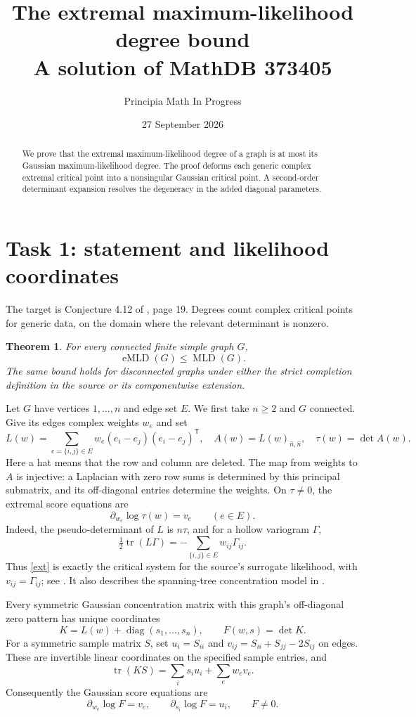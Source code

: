 \documentclass[11pt]{article}
\title{The extremal maximum-likelihood degree bound\\
\large A solution of MathDB 373405}
\author{Principia Math In Progress}
\date{27 September 2026}
\newtheorem{theorem}{Theorem}
\newcommand{\diag}{\operatorname{diag}}
\newcommand{\MLD}{\operatorname{MLD}}
\newcommand{\eMLD}{\operatorname{eMLD}}
\begin{document}
\maketitle
\begin{abstract}
We prove that the extremal maximum-likelihood degree of a graph is at
most its Gaussian maximum-likelihood degree. The proof deforms each
generic complex extremal critical point into a nonsingular Gaussian
critical point. A second-order determinant expansion resolves the
degeneracy in the added diagonal parameters.
\end{abstract}

\section*{Task 1: statement and likelihood coordinates}
The target is Conjecture 4.12 of \cite{ACGR}, page 19.
Degrees count complex critical points for generic data, on the domain
where the relevant determinant is nonzero.
\begin{theorem}\label{main}
For every connected finite simple graph $G$,
\[
 \eMLD(G)\leq\MLD(G).
\]
The same bound holds for disconnected graphs under either the strict
completion definition in the source or its componentwise extension.
\end{theorem}

Let $G$ have vertices $1,\ldots,n$ and edge set $E$. We first take
$n\geq2$ and $G$ connected. Give its edges complex weights $w_e$ and set
\[
 L(w)=\sum_{e=\{i,j\}\in E}w_e(e_i-e_j)(e_i-e_j)^{\mathsf T},
 \quad A(w)=L(w)_{\widehat n,\widehat n},\quad \tau(w)=\det A(w).
\]
Here a hat means that the row and column are deleted. The map from
weights to $A$ is injective: a Laplacian with zero row sums is determined
by this principal submatrix, and its off-diagonal entries determine the
weights. On $\tau\ne0$, the extremal score equations are
\begin{equation}\label{ext}
 \partial_{w_e}\log\tau(w)=v_e\qquad(e\in E).
\end{equation}
Indeed, the pseudo-determinant of $L$ is $n\tau$, and for a hollow
variogram $\Gamma$,
\[
 \tfrac12\operatorname{tr}(L\Gamma)
   =-\sum_{\{i,j\}\in E}w_{ij}\Gamma_{ij}.
\]
Thus \eqref{ext} is exactly the critical system for the source's
surrogate likelihood, with $v_{ij}=\Gamma_{ij}$; see \cite[Section 4,
equation (16)]{ACGR}. It also describes the spanning-tree concentration
model in \cite{CMS}.

Every symmetric Gaussian concentration matrix with this graph's
off-diagonal zero pattern has unique coordinates
\[
 K=L(w)+\diag(s_1,\ldots,s_n),\qquad F(w,s)=\det K.
\]
For a symmetric sample matrix $S$, set
$u_i=S_{ii}$ and $v_{ij}=S_{ii}+S_{jj}-2S_{ij}$ on edges. These are
invertible linear coordinates on the specified sample entries, and
\[
 \operatorname{tr}(KS)=\sum_i s_i u_i+\sum_e w_e v_e.
\]
Consequently the Gaussian score equations are
\begin{equation}\label{gauss}
 \partial_{w_e}\log F=v_e,\qquad
 \partial_{s_i}\log F=u_i,\qquad F\ne0.
\end{equation}
\end{document}
